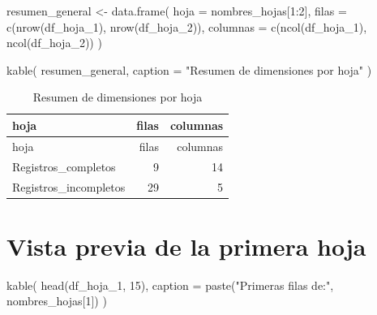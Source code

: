 \documentclass[
]{article}
\newenvironment{Shaded}{\begin{snugshade}}{\end{snugshade}}
\newcommand{\AttributeTok}[1]{\textcolor[rgb]{0.40,0.45,0.13}{#1}}
\newcommand{\DecValTok}[1]{\textcolor[rgb]{0.68,0.00,0.00}{#1}}
\newcommand{\FunctionTok}[1]{\textcolor[rgb]{0.28,0.35,0.67}{#1}}
\newcommand{\NormalTok}[1]{\textcolor[rgb]{0.00,0.23,0.31}{#1}}
\newcommand{\OtherTok}[1]{\textcolor[rgb]{0.00,0.23,0.31}{#1}}
\newcommand{\SpecialCharTok}[1]{\textcolor[rgb]{0.37,0.37,0.37}{#1}}
\newcommand{\StringTok}[1]{\textcolor[rgb]{0.13,0.47,0.30}{#1}}
\begin{document}
\begin{Shaded}
\begin{Highlighting}[]
\NormalTok{resumen\_general }\OtherTok{\textless{}{-}} \FunctionTok{data.frame}\NormalTok{(}
  \AttributeTok{hoja =}\NormalTok{ nombres\_hojas[}\DecValTok{1}\SpecialCharTok{:}\DecValTok{2}\NormalTok{],}
  \AttributeTok{filas =} \FunctionTok{c}\NormalTok{(}\FunctionTok{nrow}\NormalTok{(df\_hoja\_1), }\FunctionTok{nrow}\NormalTok{(df\_hoja\_2)),}
  \AttributeTok{columnas =} \FunctionTok{c}\NormalTok{(}\FunctionTok{ncol}\NormalTok{(df\_hoja\_1), }\FunctionTok{ncol}\NormalTok{(df\_hoja\_2))}
\NormalTok{)}

\FunctionTok{kable}\NormalTok{(}
\NormalTok{  resumen\_general,}
  \AttributeTok{caption =} \StringTok{"Resumen de dimensiones por hoja"}
\NormalTok{)}
\end{Highlighting}
\end{Shaded}

\begin{longtable}[]{@{}lrr@{}}
\caption{Resumen de dimensiones por hoja}\tabularnewline
\toprule\noalign{}
hoja & filas & columnas \\
\midrule\noalign{}
\endfirsthead
\toprule\noalign{}
hoja & filas & columnas \\
\midrule\noalign{}
\endhead
\bottomrule\noalign{}
\endlastfoot
Registros\_completos & 9 & 14 \\
Registros\_incompletos & 29 & 5 \\
\end{longtable}

\section{Vista previa de la primera
hoja}\label{vista-previa-de-la-primera-hoja}

\begin{Shaded}
\begin{Highlighting}[]
\FunctionTok{kable}\NormalTok{(}
  \FunctionTok{head}\NormalTok{(df\_hoja\_1, }\DecValTok{15}\NormalTok{),}
  \AttributeTok{caption =} \FunctionTok{paste}\NormalTok{(}\StringTok{"Primeras filas de:"}\NormalTok{, nombres\_hojas[}\DecValTok{1}\NormalTok{])}
\NormalTok{)}
\end{Highlighting}
\end{Shaded}
\end{document}
